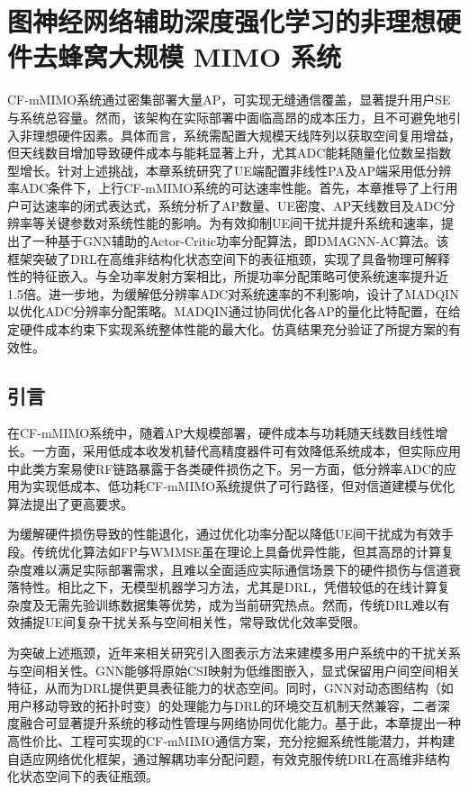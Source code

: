 \chapter{图神经网络辅助深度强化学习的非理想硬件去蜂窝大规模 MIMO 系统}\label{chap:MIMOLP}

CF‑mMIMO系统通过密集部署大量AP，可实现无缝通信覆盖，显著提升用户SE与系统总容量。然而，该架构在实际部署中面临高昂的成本压力，且不可避免地引入非理想硬件因素。具体而言，系统需配置大规模天线阵列以获取空间复用增益，但天线数目增加导致硬件成本与能耗显著上升，尤其ADC能耗随量化位数呈指数型增长。针对上述挑战，本章系统研究了UE端配置非线性PA及AP端采用低分辨率ADC条件下，上行CF‑mMIMO系统的可达速率性能。首先，本章推导了上行用户可达速率的闭式表达式，系统分析了AP数量、UE密度、AP天线数目及ADC分辨率等关键参数对系统性能的影响。为有效抑制UE间干扰并提升系统和速率，提出了一种基于GNN辅助的Actor-Critic功率分配算法，即DMAGNN-AC算法。该框架突破了DRL在高维非结构化状态空间下的表征瓶颈，实现了具备物理可解释性的特征嵌入。与全功率发射方案相比，所提功率分配策略可使系统速率提升近1.5倍。进一步地，为缓解低分辨率ADC对系统速率的不利影响，设计了MADQIN以优化ADC分辨率分配策略。MADQIN通过协同优化各AP的量化比特配置，在给定硬件成本约束下实现系统整体性能的最大化。仿真结果充分验证了所提方案的有效性。

\section{引言}

在CF‑mMIMO系统中，随着AP大规模部署，硬件成本与功耗随天线数目线性增长。一方面，采用低成本收发机替代高精度器件可有效降低系统成本，但实际应用中此类方案易使RF链路暴露于各类硬件损伤之下。另一方面，低分辨率ADC的应用为实现低成本、低功耗CF‑mMIMO系统提供了可行路径，但对信道建模与优化算法提出了更高要求。

为缓解硬件损伤导致的性能退化，通过优化功率分配以降低UE间干扰成为有效手段。传统优化算法如FP与WMMSE虽在理论上具备优异性能，但其高昂的计算复杂度难以满足实际部署需求，且难以全面适应实际通信场景下的硬件损伤与信道衰落特性。相比之下，无模型机器学习方法，尤其是DRL，凭借较低的在线计算复杂度及无需先验训练数据集等优势，成为当前研究热点。然而，传统DRL难以有效捕捉UE间复杂干扰关系与空间相关性，常导致优化效率受限。

为突破上述瓶颈，近年来相关研究引入图表示方法来建模多用户系统中的干扰关系与空间相关性。GNN能够将原始CSI映射为低维图嵌入，显式保留用户间空间相关特征，从而为DRL提供更具表征能力的状态空间。同时，GNN对动态图结构（如用户移动导致的拓扑时变）的处理能力与DRL的环境交互机制天然兼容，二者深度融合可显著提升系统的移动性管理与网络协同优化能力。基于此，本章提出一种高性价比、工程可实现的CF‑mMIMO通信方案，充分挖掘系统性能潜力，并构建自适应网络优化框架，通过解耦功率分配问题，有效克服传统DRL在高维非结构化状态空间下的表征瓶颈。


